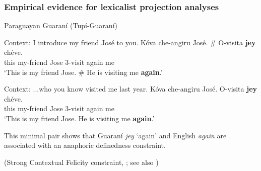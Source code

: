 \documentclass[pdf,xcolor=table,envcountsect,handout]{beamer}
\begin{document}
\begin{frame}
\frametitle{Empirical evidence for lexicalist projection analyses}

Paraguayan Guaran\'i (Tup\'i-Guaran\'i) 

\vspace*{-.2cm}

\begin{exe}

 Context: I introduce my friend Jos\'e to you. \gll K\'ova che-angiru Jos\'e. \# O-visita {\bf jey} ch\'eve. \\ this my-friend Jose {} 3-visit again me \\ \glt `This is my friend Jose. \# He is visiting me {\bf again}.'

\pause

 Context: ...who you know visited me last year. \gll K\'ova che-angiru Jos\'e. O-visita {\bf jey} ch\'eve. \\ this my-friend Jose 3-visit again me \\ \glt `This is my friend Jose. He is visiting me {\bf again}.'

\end{exe}

\medskip
This minimal pair shows that Guaran\'i {\em jey} `again' and English {\em again} are associated with an anaphoric definedness constraint. \\[-.2cm] \hfill \begin{tiny} (Strong Contextual Felicity constraint, \citealt{brst-lang11}; see also \citealt{tiemann-etal11,tiemann-etal14})\end{tiny}

\end{frame}
\end{document}
